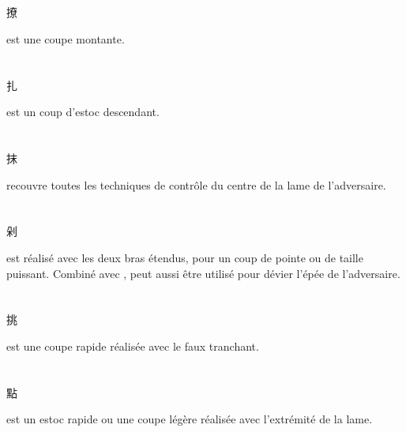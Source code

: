 \section{\Liao}
\Liao{} \begin{CJK*}{UTF8}{bsmi}撩\end{CJK*} est une coupe montante.

\section{\Zha}
\Zha{} \begin{CJK*}{UTF8}{bsmi}扎\end{CJK*} est un coup d'estoc descendant.

\section{\Mo}
\Mo{} \begin{CJK*}{UTF8}{bsmi}抹\end{CJK*} recouvre toutes les techniques de contr\^{o}le du centre de la lame de l'adversaire. 

\section{\Duo}
\Duo{} \begin{CJK*}{UTF8}{bsmi}剁\end{CJK*} est réalisé avec les deux bras étendus, pour un coup de pointe ou de taille puissant.
Combiné avec \Mo{}, \Duo{} peut aussi \^{e}tre utilisé pour dévier l'épée de l'adversaire.

\section{\Tiao}
\Tiao{} \begin{CJK*}{UTF8}{bsmi}挑\end{CJK*} est une coupe rapide réalisée avec le faux tranchant.


\section{\Dian}
\Dian{} \begin{CJK*}{UTF8}{bsmi}點\end{CJK*} est un estoc rapide ou une coupe légère réalisée avec l'extrémité de la lame.